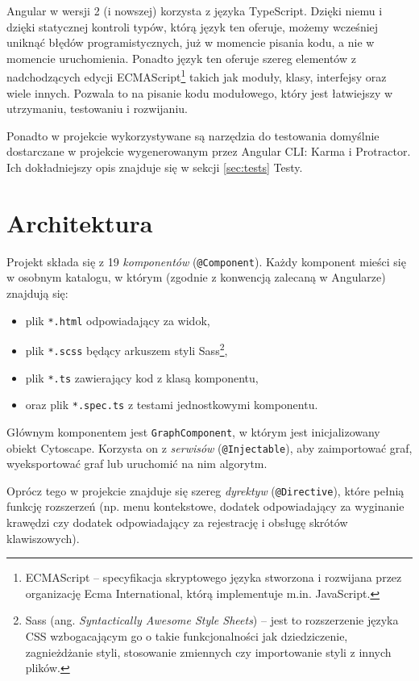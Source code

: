Angular w wersji 2 (i nowszej) korzysta z języka TypeScript. Dzięki niemu i dzięki statycznej kontroli typów, którą język ten oferuje, możemy wcześniej uniknąć błędów programistycznych, już w momencie pisania kodu, a nie w momencie uruchomienia. Ponadto język ten oferuje szereg elementów z nadchodzących edycji ECMAScript\footnote{ECMAScript -- specyfikacja skryptowego języka stworzona i rozwijana przez organizację Ecma International, którą implementuje m.in. JavaScript.} takich jak moduły, klasy, interfejsy oraz wiele innych. Pozwala to na pisanie kodu modułowego, który jest łatwiejszy w utrzymaniu, testowaniu i rozwijaniu.

Ponadto w projekcie wykorzystywane są narzędzia do testowania domyślnie dostarczane w projekcie wygenerowanym przez Angular CLI: Karma i Protractor. Ich dokładniejszy opis znajduje się w sekcji \ref{sec:tests} Testy.

\section{Architektura}

Projekt składa się z 19 \emph{komponentów} (\texttt{@Component}). Każdy komponent mieści się w osobnym katalogu, w którym (zgodnie z konwencją zalecaną w Angularze) znajdują się: 
\begin{itemize}
\setlength\itemsep{0em}
\item plik \texttt{*.html} odpowiadający za widok, 
\item plik \texttt{*.scss} będący arkuszem styli Sass\footnote{Sass (ang. \textit{Syntactically Awesome Style Sheets}) -- jest to rozszerzenie języka CSS wzbogacającym go o takie funkcjonalności jak dziedziczenie, zagnieżdżanie styli, stosowanie zmiennych czy importowanie styli z innych plików.}, 
\item plik \texttt{*.ts} zawierający kod z klasą komponentu,
\item oraz plik \texttt{*.spec.ts} z testami jednostkowymi komponentu. 
\end{itemize}

Głównym komponentem jest \texttt{GraphComponent}, w którym jest inicjalizowany obiekt Cytoscape. Korzysta on z \emph{serwisów} (\texttt{@Injectable}), aby zaimportować graf, wyeksportować graf lub uruchomić na nim algorytm.

Oprócz tego w projekcie znajduje się szereg \emph{dyrektyw} (\texttt{@Directive}), które pełnią funkcję rozszerzeń (np. menu kontekstowe, dodatek odpowiadający za wyginanie krawędzi czy dodatek odpowiadający za rejestrację i obsługę skrótów klawiszowych).

